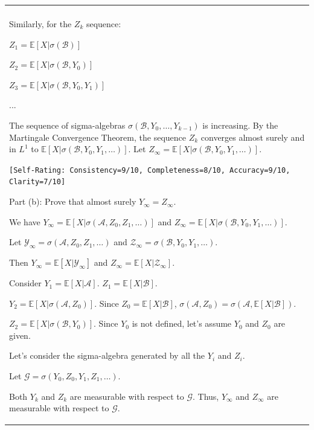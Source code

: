 \documentclass{article}
\theoremstyle{plain}
\theoremstyle{definition}
\theoremstyle{remark}
\newcommand{\defaultlightblue}[1]{{\leavevmode\color{bluec}#1}}
\begin{document}
\begin{longtable}{@{}p{\textwidth}@{}}
{}
\\
\defaultlightblue{

Similarly, for the \(Z_k\) sequence:

\( Z_1 = \mathbb{E}[X|\sigma(\mathcal{B})] \)

\( Z_2 = \mathbb{E}[X|\sigma(\mathcal{B}, Y_0)] \)

\( Z_3 = \mathbb{E}[X|\sigma(\mathcal{B}, Y_0, Y_1)] \)

...

The sequence of sigma-algebras \( \sigma(\mathcal{B}, Y_0, \ldots, Y_{k-1}) \) is increasing. By the Martingale Convergence Theorem, the sequence \(Z_k\) converges almost surely and in \(L^1\) to \( \mathbb{E}[X|\sigma(\mathcal{B}, Y_0, Y_1, \ldots)] \). Let \( Z_\infty = \mathbb{E}[X|\sigma(\mathcal{B}, Y_0, Y_1, \ldots)] \).

\texttt{\small [Self-Rating: Consistency=9/10, Completeness=8/10, Accuracy=9/10, Clarity=7/10]}

Part (b): Prove that almost surely \( Y_\infty = Z_\infty \).

We have \( Y_\infty = \mathbb{E}[X|\sigma(\mathcal{A}, Z_0, Z_1, \ldots)] \) and \( Z_\infty = \mathbb{E}[X|\sigma(\mathcal{B}, Y_0, Y_1, \ldots)] \).



Let \( \mathcal{Y}_\infty = \sigma(\mathcal{A}, Z_0, Z_1, \ldots) \) and \( \mathcal{Z}_\infty = \sigma(\mathcal{B}, Y_0, Y_1, \ldots) \).

Then \( Y_\infty = \mathbb{E}[X|\mathcal{Y}_\infty] \) and \( Z_\infty = \mathbb{E}[X|\mathcal{Z}_\infty] \).



Consider \( Y_1 = \mathbb{E}[X|\mathcal{A}] \). \( Z_1 = \mathbb{E}[X|\mathcal{B}] \).

\( Y_2 = \mathbb{E}[X|\sigma(\mathcal{A}, Z_0)] \). Since \( Z_0 = \mathbb{E}[X|\mathcal{B}] \), \( \sigma(\mathcal{A}, Z_0) = \sigma(\mathcal{A}, \mathbb{E}[X|\mathcal{B}]) \).

\( Z_2 = \mathbb{E}[X|\sigma(\mathcal{B}, Y_0)] \). Since \( Y_0 \) is not defined, let's assume \( Y_0 \) and \( Z_0 \) are given.



Let's consider the sigma-algebra generated by all the \(Y_i\) and \(Z_i\).

Let \( \mathcal{G} = \sigma(Y_0, Z_0, Y_1, Z_1, \ldots) \).

Both \(Y_k\) and \(Z_k\) are measurable with respect to \(\mathcal{G}\). Thus, \(Y_\infty\) and \(Z_\infty\) are measurable with respect to \(\mathcal{G}\).



}
\end{longtable}
\end{document}
